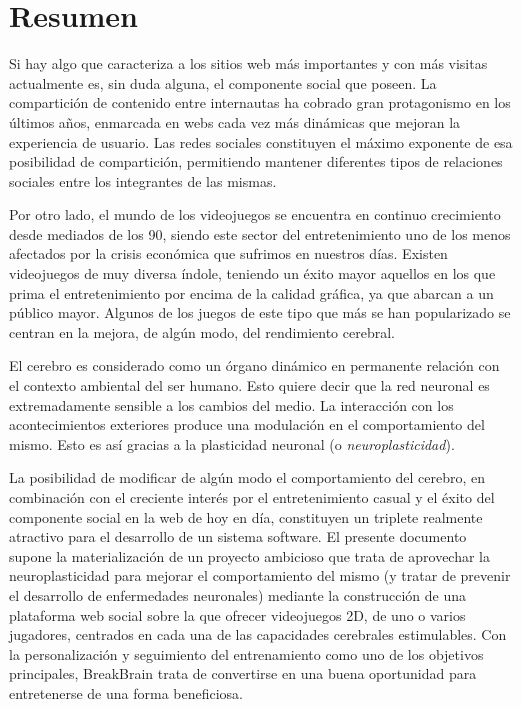 
\chapter{Resumen}

Si hay algo que caracteriza a los sitios web más importantes y con más visitas actualmente es, sin duda alguna, el componente social que poseen. La compartición de contenido entre internautas ha cobrado gran protagonismo en los últimos años, enmarcada en webs cada vez más dinámicas que mejoran la experiencia de usuario. Las redes sociales constituyen el máximo exponente de esa posibilidad de compartición, permitiendo mantener diferentes tipos de relaciones sociales entre los integrantes de las mismas. 

Por otro lado, el mundo de los videojuegos se encuentra en continuo crecimiento desde mediados de los 90, siendo este sector del entretenimiento uno de los menos afectados por la crisis económica que sufrimos en nuestros días. Existen videojuegos de muy diversa índole, teniendo un éxito mayor aquellos en los que prima el entretenimiento por encima de la calidad gráfica, ya que abarcan a un público mayor. Algunos de los juegos de este tipo que más se han popularizado se centran en la mejora, de algún modo, del rendimiento cerebral.

El cerebro es considerado como un órgano dinámico en permanente relación con el contexto ambiental del ser humano. Esto quiere decir que la red neuronal es extremadamente sensible a los cambios del medio. La interacción con los acontecimientos exteriores produce una modulación en el comportamiento del mismo. Esto es así gracias a la plasticidad neuronal (o {\it neuroplasticidad}).

La posibilidad de modificar de algún modo el comportamiento del cerebro, en combinación con el creciente interés por el entretenimiento casual y el éxito del componente social en la web de hoy en día, constituyen un triplete realmente atractivo para el desarrollo de un sistema software. El presente documento supone la materialización de un proyecto ambicioso que trata de aprovechar la neuroplasticidad para mejorar el comportamiento del mismo (y tratar de prevenir el desarrollo de enfermedades neuronales) mediante la construcción de una plataforma web social sobre la que ofrecer videojuegos 2D, de uno o varios jugadores, centrados en cada una de las capacidades cerebrales estimulables. Con la personalización y seguimiento del entrenamiento como uno de los objetivos principales, BreakBrain trata de convertirse en una buena oportunidad para entretenerse de una forma beneficiosa.




